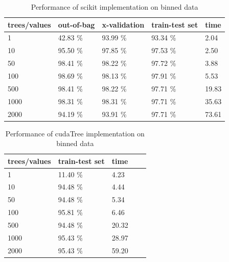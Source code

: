 \documentclass[thesis=B,english]{FITthesis}[2012/10/20]
\begin{document}
\begin{table}[h]
\begin{tabular}{|l|l|l|l|l|}
\hline
trees/values & out-of-bag & x-validation & train-test set & time \\ \hline
1            &42.83 \%           &93.99 \%              &93.34 \%                & 2.04          \\ \hline
10           &95.50 \%           &97.85 \%              &97.53 \%                &2.50           \\ \hline
50           &98.41 \%           &98.22 \%              &97.72 \%                &3.88        \\ \hline
100          &98.69 \%           &98.13 \%              &97.91 \%                &5.53        \\ \hline
500          &98.41 \%           &98.22 \%              &97.71 \%                &19.83      \\ \hline
1000         &98.31 \%           &98.31 \%              &97.71 \%                &35.63         \\ \hline
2000         &94.19 \%           &93.91 \%              &97.71 \%                &73.61        \\ \hline
\end{tabular}
\caption{Performance of scikit implementation on binned data}
\label{tab:scikit-binned}
\end{table}
\begin{table}[h]
\begin{tabular}{|l|l|l|l|l|}
\hline
trees/values & train-test set & time \\ \hline
1            & 11.40 \%              & 4.23      \\ \hline
10           & 94.48 \%              & 4.44      \\ \hline
50           & 94.48 \%              & 5.34      \\ \hline
100          & 95.81 \%              & 6.46      \\ \hline
500          & 94.48 \%              & 20.32     \\ \hline
1000         & 95.43 \%              & 28.97     \\ \hline
2000         & 95.43 \%              & 59.20     \\ \hline
\end{tabular}
\caption{Performance of cudaTree implementation on binned data}
\label{tab:scikit-binned}
\end{table}
\end{document}
